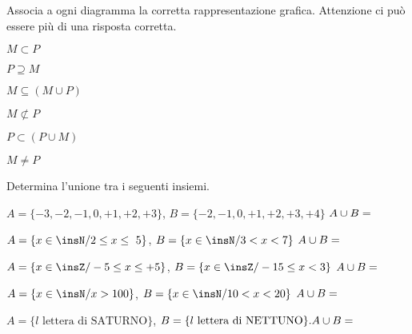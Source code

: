 \begin{esercizio}
\label{ese:7.44}
Associa a ogni diagramma la corretta rappresentazione grafica. Attenzione ci può 
essere più di una risposta corretta.
\begin{multicols}{2}
\begin{enumeratea}
 \item \(M\subset P\) \hfill\boxA\quad\boxB\quad\boxC\quad\boxD\quad\boxE
\item \(P\supseteq M\) \hfill\boxA\quad\boxB\quad\boxC\quad\boxD\quad\boxE
\item \(M\subseteq (M\cup P)\) \hfill\boxA\quad\boxB\quad\boxC\quad\boxD\quad\boxE
\item \(M\not\subset P\) \hfill\boxA\quad\boxB\quad\boxC\quad\boxD\quad\boxE
\item \(P\subset (P\cup M)\) \hfill\boxA\quad\boxB\quad\boxC\quad\boxD\quad\boxE
\item \(M\neq P\) \hfill\boxA\quad\boxB\quad\boxC\quad\boxD\quad\boxE
\end{enumeratea}
\end{multicols}
\begin{center}

\end{center}
\end{esercizio}

\newpage %

\begin{esercizio}
\label{ese:7.45}
Determina l'unione tra i seguenti insiemi.

\begin{enumeratea}
 \item \(A=\{-3,-2,-1,0,+1,+2,+3\}\), \(B=\{-2,-1,0,+1,+2,+3,+4\}\) \(A\cup 
B=\dotfill\)
 \item \(A=\{x\in\insN/2\le x\le~5\}\), \(B=\{x\in\insN/3<x<7\}\) \(A\cup B=\dotfill\)
 \item \(A=\{x\in\insZ/-5\le x\le +5\}\), \(B=\{x\in\insZ/-15\le x<3\}\) \(A\cup 
B=\dotfill\)
 \item \(A=\{x\in\insN/x>100\}\), \(B=\{x\in \insN/10<x<20\}\) \(A\cup B=\dotfill\)
 \item \(A=\{l\text{ lettera di SATURNO}\}\), \(B=\{l\text{ lettera di NETTUNO}\}. 
A\cup B=\dotfill\)
\end{enumeratea}
\end{esercizio}

